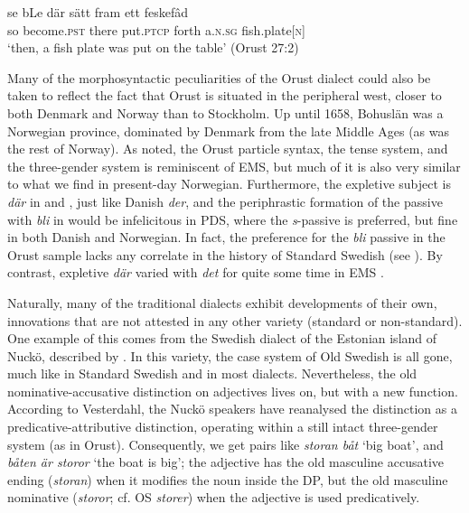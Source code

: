 \documentclass[output=paper]{langscibook}
\begin{document}
\ex \label{ex:intro:39d}
\gll  se bLe         där   sätt       fram   ett     feskefâd\\
    so become.\textsc{pst}   there   put.\textsc{ptcp}   forth   a.\textsc{n.sg}   fish.plate[\textsc{n}]\\
\glt `then, a fish plate was put on the table’ (Orust 27:2)
\z
\z


Many of the morphosyntactic peculiarities of the Orust dialect could also be taken to reflect the fact that Orust is situated in the peripheral west, closer to both Denmark and Norway than to Stockholm. Up until 1658, Bohuslän was a Norwegian province, dominated by Denmark from the late Middle Ages (as was the rest of Norway). As noted, the Orust particle syntax, the tense system, and the three-gender system is reminiscent of EMS, but much of it is also very similar to what we find in present-day Norwegian. Furthermore, the expletive subject is \textit{där} in  and , just like Danish \textit{der}, and the periphrastic formation of the passive with \textit{bli} in  would be infelicitous in PDS, where the \textit{s}{}-passive is preferred, but fine in both Danish and Norwegian. In fact, the preference for the \textit{bli} passive in the Orust sample lacks any correlate in the history of Standard Swedish (see ). By contrast, expletive \textit{där} varied with \textit{det} for quite some time in EMS \citep{Falk1993}.



Naturally, many of the traditional dialects exhibit developments of their own, innovations that are not attested in any other variety (standard or non-standard). One example of this comes from the Swedish dialect of the Estonian island of Nuckö, described by \citet{Vesterdahl2018}. In this variety, the case system of Old Swedish is all gone, much like in Standard Swedish and in most dialects. Nevertheless, the old nominative-accusative distinction on adjectives lives on, but with a new function. According to Vesterdahl, the Nuckö speakers have reanalysed the distinction as a predicative-attributive distinction, operating within a still intact three-gender system (as in Orust). Consequently, we get pairs like \textit{storan båt} ‘big boat’, and \textit{båten är storor} ‘the boat is big’; the adjective has the old masculine accusative ending (\textit{storan}) when it modifies the noun inside the DP, but the old masculine nominative (\textit{storor}; cf. OS \textit{storer}) when the adjective is used predicatively.
\end{document}
